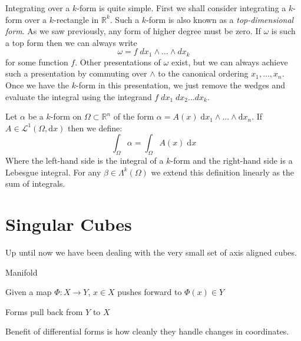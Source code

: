 Integrating over a $k$-form is quite simple.
First we shall consider integrating a $k$-form over a $k$-rectangle in $\mathbb{R}^k$.
Such a $k$-form is also known as a \emph{top-dimensional form}.
As we saw previously, any form of higher degree must be zero.
If $\omega$ is such a top form then we can always write
\begin{equation}
	\omega = f \; dx_1 \wedge \ldots \wedge dx_k
\end{equation}
for some function $f$.
Other presentations of $\omega$ exist, but we can always achieve such a presentation by commuting over $\wedge$ 
to the canonical ordering $x_1, \ldots, x_n$.
Once we have the $k$-form in this presentation, we just remove the wedges and evaluate the integral using the
integrand $f \; dx_1 \;dx_2 \ldots dx_k$.

\begin{definition}
Let $\alpha$ be a $k$-form on $\Omega \subset \mathbb{R}^n$ of the form $\alpha = A(x) \; \text{d}x_1 \wedge ... \wedge \text{d} x_n$.
If $A \in \mathcal{L}^1 (\Omega , \text{d}x)$ then we define:
\begin{equation}
\int_\Omega \alpha = \int_\Omega A(x) \; \text{d}x
\end{equation}
Where the left-hand side is the integral of a $k$-form and the right-hand side is a Lebesgue integral.
For any $\beta \in \Lambda^k (\Omega)$ we extend this definition linearly as the sum of integrals.
\end{definition}


%
%

\section{Singular Cubes}

Up until now we have been dealing with the very small set of axis aligned cubes.

\begin{definition}
	Manifold
\end{definition}

\begin{definition}
	Given a map $\varPhi : X \to Y$, $x \in X$ pushes forward to $\Phi(x) \in Y$
\end{definition}

Forms pull back from $Y$ to $X$

Benefit of differential forms is how cleanly they handle changes in coordinates.

